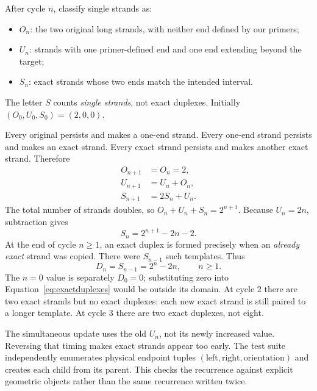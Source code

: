 After cycle $n$, classify single strands as:
\begin{itemize}
\item $O_n$: the two original long strands, with neither end defined by our primers;
\item $U_n$: strands with one primer-defined end and one end extending beyond the target;
\item $S_n$: exact strands whose two ends match the intended interval.
\end{itemize}
The letter $S$ counts \emph{single strands}, not exact duplexes. Initially $(O_0,U_0,S_0)=(2,0,0)$.

Every original persists and makes a one-end strand. Every one-end strand persists and makes an exact strand. Every exact strand persists and makes another exact strand. Therefore
\begin{align}
O_{n+1}&=O_n=2,\\
U_{n+1}&=U_n+O_n,\\
S_{n+1}&=2S_n+U_n. \label{eq:lineage}
\end{align}
The total number of strands doubles, so $O_n+U_n+S_n=2^{n+1}$. Because $U_n=2n$, subtraction gives
\begin{equation}
S_n=2^{n+1}-2n-2. \label{eq:exactstrands}
\end{equation}
At the end of cycle $n\geq1$, an exact duplex is formed precisely when an \emph{already exact} strand was copied. There were $S_{n-1}$ such templates. Thus
\begin{equation}
D_n=S_{n-1}=2^n-2n,\qquad n\geq1. \label{eq:exactduplexes}
\end{equation}
The $n=0$ value is separately $D_0=0$; substituting zero into Equation~\ref{eq:exactduplexes} would be outside its domain. At cycle 2 there are two exact strands but no exact duplexes: each new exact strand is still paired to a longer template. At cycle 3 there are two exact duplexes, not eight.

\begin{center}\end{center}
The simultaneous update uses the old $U_n$, not its newly increased value. Reversing that timing makes exact strands appear too early. The test suite independently enumerates physical endpoint tuples $(\text{left},\text{right},\text{orientation})$ and creates each child from its parent. This checks the recurrence against explicit geometric objects rather than the same recurrence written twice.

